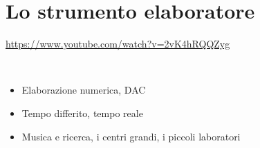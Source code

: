 
\section{Lo strumento elaboratore}

\url{https://www.youtube.com/watch?v=2vK4hRQQZyg}

~\vfill

\begin{itemize}
\item Elaborazione numerica, DAC
\item Tempo differito, tempo reale
\item Musica e ricerca, i centri grandi, i piccoli laboratori
\end{itemize}

\clearpage
